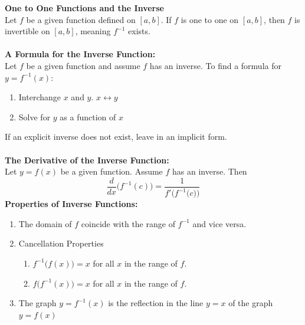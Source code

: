 \documentclass[14pt]{article}
\begin{document}
    \textbf{One to One Functions and the Inverse}\\
    Let $f$ be a given function defined on $[a,b]$. If $f$ is one to one on $[a,b]$, then $f$ is invertible on $[a,b]$, meaning $f^{-1}$ exists.\\\\
    \textbf{A Formula for the Inverse Function:}\\
    Let $f$ be a given function and assume $f$ has an inverse. To find a formula for $y=f^{-1}(x)$:
    \begin{enumerate}
        \item Interchange $x$ and $y$. $x\leftrightarrow y$
        \item Solve for $y$ as a function of $x$
    \end{enumerate}
    If an explicit inverse does not exist, leave in an implicit form.\\\\
    \textbf{The Derivative of the Inverse Function:}\\
    Let $y=f(x)$ be a given function. Assume $f$ has an inverse. Then 
    $$\frac{d}{dx}\Big(f^{-1}(c)\Big)=\frac{1}{f'\Big(f^{-1}\big(c\big) \Big)}$$
    \textbf{Properties of Inverse Functions:}\\
    \begin{enumerate}
        \item The domain of $f$ coincide with the range of $f^{-1}$ and vice versa.
        \item Cancellation Properties \begin{enumerate}
            \item $f^{-1}\Big(f(x)\Big)=x$ for all $x$ in the range of $f$.
            \item $f\Big(f^{-1}(x)\Big)=x$ for all $x$ in the range of $f$.
        \end{enumerate} 
        \item The graph $y=f^{-1}(x)$ is the reflection in the line $y=x$ of the graph $y=f(x)$
    \end{enumerate}
\end{document}
